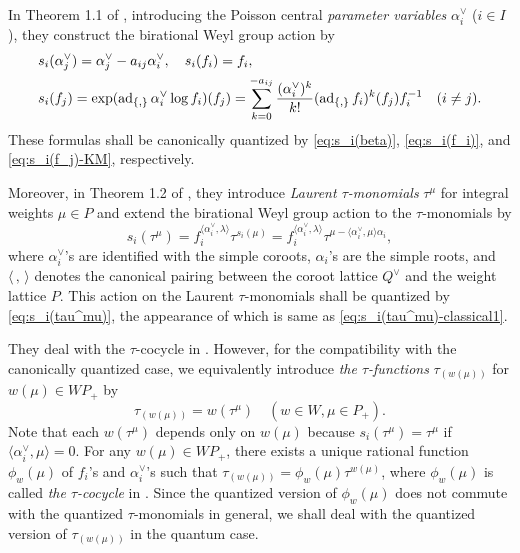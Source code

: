 \documentclass[12pt,twoside]{article}
\newcommand\bra{\langle}
\newcommand\ket{\rangle}
\newcommand\ad{\mathop{\mathrm{ad}}\nolimits}
\newcommand\av{\alpha^\vee}
\newcommand\Qv{Q^\vee}
\theoremstyle{plain} %
\theoremstyle{definition} %
\theoremstyle{definition} %
\numberwithin{theorem}{section}
\numberwithin{equation}{section}
\numberwithin{figure}{section}
\numberwithin{table}{section}
\begin{document}
In Theorem 1.1 of \cite{NY0012028}, 
introducing the Poisson central {\em parameter variables} $\av_i$ ($i\in I$), 
they construct the birational Weyl group action by
\begin{align}
 &
 s_i(\av_j) = \av_j-a_{ij}\av_i, \quad
 s_i(f_i)=f_i,
 \notag 
 \\ &
 s_i(f_j) 
 = \exp(\ad_{\{,\}}\av_i\log f_i)(f_j)
 = \sum_{k=0}^{-a_{ij}} \frac{(\av_i)^k}{k!}(\ad_{\{,\}} f_i)^k(f_j) f_i^{-1}
 \quad (i\ne j).
 \label{eq:s_i(f_j)-classical}
\end{align}
These formulas shall be canonically quantized by 
\eqref{eq:s_i(beta)}, 
\eqref{eq:s_i(f_i)}, and 
\eqref{eq:s_i(f_j)-KM}, respectively.

Moreover, in Theorem 1.2 of \cite{NY0012028}, 
they introduce {\em Laurent $\tau$-monomials} $\tau^\mu$ 
for integral weights $\mu\in P$ 
and extend the birational Weyl group action to the $\tau$-monomials by
\begin{equation}
 s_i(\tau^\mu) 
 = f_i^{\bra\av_i,\lambda\ket} \tau^{s_i(\mu)}
 = f_i^{\bra\av_i,\lambda\ket} \tau^{\mu-\bra\av_i,\mu\ket\alpha_i},
 \label{eq:s_i(tau^mu)-classical1}
\end{equation}
where $\av_i$'s are identified with the simple coroots, 
$\alpha_i$'s are the simple roots, 
and $\bra\,,\,\ket$ denotes the canonical pairing between the coroot lattice $\Qv$
and the weight lattice $P$.
This action on the Laurent $\tau$-monomials shall
be quantized by \eqref{eq:s_i(tau^mu)}, the appearance of which is same as
\eqref{eq:s_i(tau^mu)-classical1}.

They deal with the $\tau$-cocycle in \cite{NY0012028}.
However, for the compatibility with the canonically quantized case, 
we equivalently introduce {\em the $\tau$-functions} $\tau_{(w(\mu))}$ 
for $w(\mu)\in WP_+$ by
\begin{equation*}
 \tau_{(w(\mu))} = w(\tau^\mu) \quad (w\in W, \mu\in P_+).
\end{equation*}
Note that each $w(\tau^\mu)$ depends only on $w(\mu)$ 
because $s_i(\tau^\mu)=\tau^\mu$ if $\bra\av_i,\mu\ket=0$.
For any $w(\mu)\in WP_+$, there exists a unique rational function $\phi_w(\mu)$
of $f_i$'s and $\av_i$'s such that $\tau_{(w(\mu))}=\phi_w(\mu)\tau^{w(\mu)}$, 
where $\phi_w(\mu)$ is called {\em the $\tau$-cocycle} in \cite{NY0012028}.
Since the quantized version of $\phi_w(\mu)$ does not commute 
with the quantized $\tau$-monomials in general, 
we shall deal with the quantized version of $\tau_{(w(\mu))}$ in the quantum case.
\end{document}
